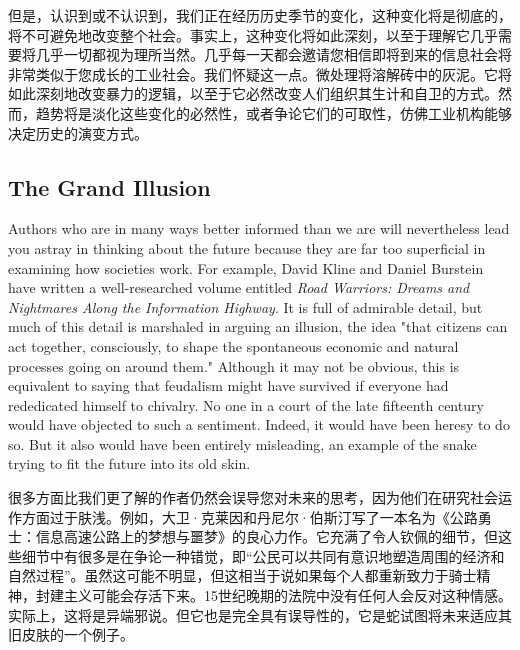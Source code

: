 \begin{Parallel}{97mm}{45mm}
  \ParallelRText
  {但是，认识到或不认识到，我们正在经历历史季节的变化，这种变化将是彻底的，将不可避免地改变整个社会。事实上，这种变化将如此深刻，以至于理解它几乎需要将几乎一切都视为理所当然。几乎每一天都会邀请您相信即将到来的信息社会将非常类似于您成长的工业社会。我们怀疑这一点。微处理将溶解砖中的灰泥。它将如此深刻地改变暴力的逻辑，以至于它必然改变人们组织其生计和自卫的方式。然而，趋势将是淡化这些变化的必然性，或者争论它们的可取性，仿佛工业机构能够决定历史的演变方式。}
  \ParallelPar

  \subsection{The Grand Illusion}

  \ParallelLText
  {Authors who are in many ways better informed than we are will nevertheless lead you astray in thinking about the future because they are far too superficial in examining how societies work. For example, David Kline and Daniel Burstein have written a well-researched volume entitled \emph{Road Warriors: Dreams and Nightmares Along the Information Highway}. It is full of admirable detail, but much of this detail is marshaled in arguing an illusion, the idea "that citizens can act together, consciously, to shape the spontaneous economic and natural processes going on around them." Although it may not be obvious, this is equivalent to saying that feudalism might have survived if everyone had rededicated himself to chivalry. No one in a court of the late fifteenth century would have objected to such a sentiment. Indeed, it would have been heresy to do so. But it also would have been entirely misleading, an example of the snake trying to fit the future into its old skin.}
  
  \ParallelRText
  {很多方面比我们更了解的作者仍然会误导您对未来的思考，因为他们在研究社会运作方面过于肤浅。例如，大卫·克莱因和丹尼尔·伯斯汀写了一本名为《公路勇士：信息高速公路上的梦想与噩梦》的良心力作。它充满了令人钦佩的细节，但这些细节中有很多是在争论一种错觉，即“公民可以共同有意识地塑造周围的经济和自然过程”。虽然这可能不明显，但这相当于说如果每个人都重新致力于骑士精神，封建主义可能会存活下来。15世纪晚期的法院中没有任何人会反对这种情感。实际上，这将是异端邪说。但它也是完全具有误导性的，它是蛇试图将未来适应其旧皮肤的一个例子。}
  \ParallelPar




\end{Parallel}
